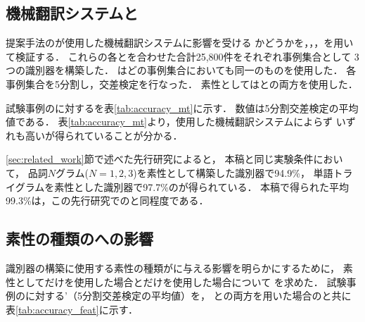 \documentclass[japanese]{jnlp_1.4}
\newcommand{\AL}{}
\newcommand{\NAL}{}
\newcommand{\HUM}{}
\newcommand{\MT}{}
\newcommand{\ACC}{}
\newcommand{\MTS}{}
\newcommand{\MTF}{}
\newcommand{\MTL}{}
\begin{document}
\begin{table}[b]
\caption{各評価者の評価値の度数分布表}
\label{tab:freq-flu-each}

\end{table}
\begin{table}[b]
\caption{{\AL}と{\NAL}の出現比率}
\label{tab:align_distri}

\end{table}



\subsection{機械翻訳システムと{\ACC}}
\label{sec:experiment:accuracy_mt}


提案手法の{\ACC}が使用した機械翻訳システムに影響を受ける
かどうかを，{\MTS}，{\MTF}，{\MTL}を用いて検証する．
これらの各{\MT}と{\HUM}を合わせた合計25,800件をそれぞれ事例集合として
3つの識別器を構築した．
{\HUM}はどの事例集合においても同一のものを使用した．
各事例集合を5分割し，交差検定を行なった．
素性としては{\AL}と{\NAL}の両方を使用した．

試験事例の{\MT}に対する{\ACC}を表\ref{tab:accuracy_mt}に示す．
数値は5分割交差検定の平均値である．
表\ref{tab:accuracy_mt}より，使用した機械翻訳システムによらず
いずれも高い{\ACC}が得られていることが分かる．

\ref{sec:related_work}節で述べた先行研究\cite{Tanaka08}によると，
本稿と同じ実験条件において，
品詞$N$グラム($N=1,2,3$)を素性として構築した識別器で94.9\%，
単語トライグラムを素性とした識別器で97.7\%の{\ACC}が得られている．
本稿で得られた平均{\ACC}99.3\%は，この先行研究での{\ACC}と同程度である．


\subsection{素性の種類の{\ACC}への影響}
\label{sec:experiment:accuracy_feats}

識別器の構築に使用する素性の種類が{\ACC}に与える影響を明らかにするために，
素性として{\AL}だけを使用した場合と{\NAL}だけを使用した場合について
{\ACC}を求めた．
試験事例の{\MT}に対する{\ACC}’（5分割交差検定の平均値）を，
{\AL}と{\NAL}の両方を用いた場合の{\ACC}と共に
表\ref{tab:accuracy_feat}に示す．

\begin{table}[b]
\caption{提案手法の{\ACC}}
\label{tab:accuracy_mt}

\end{table}
\begin{table}[b]
\caption{素性の種類と{\ACC}}
\label{tab:accuracy_feat}

\end{table}
\end{document}
